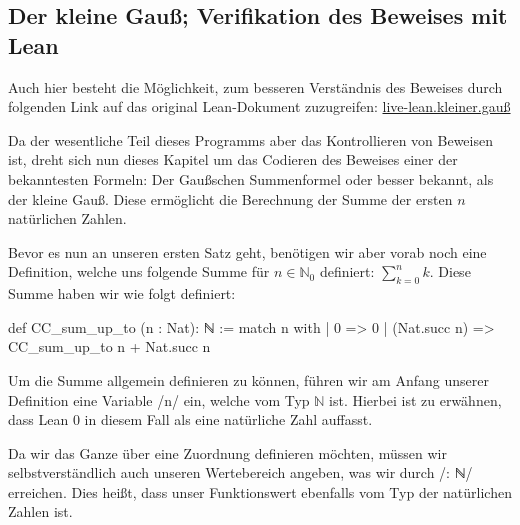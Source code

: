 \documentclass[10pt]{article}
\begin{document}
\subsection{Der \glqq kleine Gauß\grqq; Verifikation des Beweises mit Lean}
\noindent Auch hier besteht die Möglichkeit, zum besseren Verständnis des Beweises durch folgenden Link auf das
original Lean-Dokument zuzugreifen: \href{https://live.lean-lang.org/#code=import%20Mathlib.Data.Nat.Basic%0D%0Aimport%20Mathlib.Data.Real.Basic%0D%0A%0D%0Adef%20CC_sum_up_to%20(n%20%3A%20Nat)%3A%20%E2%84%95%20%3A%3D%0D%0A%20%20match%20n%20with%0D%0A%20%20%20%20%7C%200%20%3D%3E%200%0D%0A%20%20%20%20%7C%20(Nat.succ%20n)%20%3D%3E%20CC_sum_up_to%20n%20%2B%20Nat.succ%20n%0D%0A%0D%0A%23eval%20CC_sum_up_to%204%0D%0A%0D%0A%0D%0A%0D%0Atheorem%20CC_kleiner_gauss%20(n%3A%20Nat)%20%3A%0D%0A%20%20CC_sum_up_to%20n%20*%202%20%3D%20n%20*%20(n%20%2B%201)%20%3A%3D%20by%0D%0A%0D%0A%20%20induction%20n%20with%0D%0A%20%20%20%20%7C%20zero%20%3D%3E%0D%0A%20%20%20%20simp%0D%0A%20%20%20%20rw%20%5BCC_sum_up_to%5D%0D%0A%20%20%20%20%7C%20succ%20d%20hd%20%3D%3E%0D%0A%20%20%20%20rw%20%5BCC_sum_up_to%5D%0D%0A%20%20%20%20rw%20%5BNat.succ_eq_add_one%5D%0D%0A%20%20%20%20rw%20%5BNat.add_mul%5D%0D%0A%20%20%20%20rw%20%5BNat.mul_add%5D%0D%0A%20%20%20%20rw%20%5BNat.mul_one%5D%0D%0A%0D%0A%20%20%20%20rw%20%5BNat.add_mul%20d%201%20(d%20%2B%201)%5D%0D%0A%20%20%20%20simp%0D%0A%20%20%20%20rw%20%5Badd_assoc%5D%0D%0A%20%20%20%20rw%20%5B%E2%86%90%20Nat.mul_two%20(d%20%2B%201)%5D%0D%0A%20%20%20%20simp%0D%0A%20%20%20%20exact%20hd}{live-lean.kleiner.gauß}\par
\vspace{0.2cm} 
\noindent Da der wesentliche Teil dieses Programms aber das Kontrollieren von Beweisen ist, dreht sich nun dieses Kapitel um das Codieren des Beweises einer der bekanntesten Formeln: Der Gaußschen Summenformel oder besser bekannt, als der \glqq kleine Gauß\grqq. Diese ermöglicht die Berechnung der Summe der ersten $n$ natürlichen Zahlen.

\noindent Bevor es nun an unseren ersten Satz geht, benötigen wir aber vorab noch eine Definition, welche uns folgende Summe für $n\in \mathbb{N}_0$ definiert: $\sum_{k=0}^{n}k$. Diese Summe haben wir wie folgt definiert:
\begin{leancode}
def CC_sum_up_to (n : Nat): ℕ :=
  match n with
    | 0 => 0
    | (Nat.succ n) => CC_sum_up_to n + Nat.succ n
\end{leancode}
Um die Summe allgemein definieren zu können, führen wir am Anfang unserer Definition eine Variable \lean/n/ ein, welche vom Typ $\mathbb{N}$ ist. Hierbei ist zu erwähnen, dass Lean $0$ in diesem Fall als eine natürliche Zahl auffasst.\par
\noindent Da wir das Ganze über eine Zuordnung definieren möchten, müssen wir selbstverständlich auch unseren Wertebereich angeben, was wir durch \lean/: ℕ/ erreichen. Dies heißt, dass unser Funktionswert ebenfalls vom Typ der natürlichen Zahlen ist.
\end{document}
